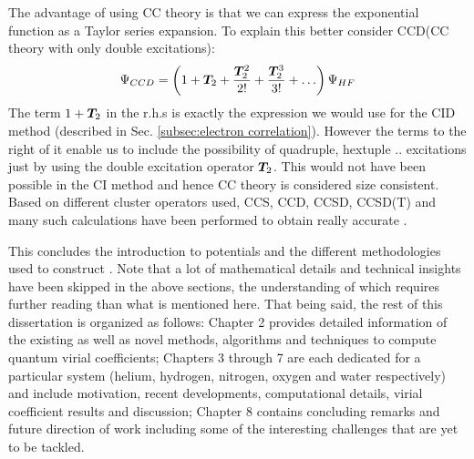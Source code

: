                 The advantage of using CC theory is that we can express the exponential function as a Taylor series expansion. To explain this better consider CCD(CC theory with only double excitations):
                \begin{equation}\label{eq:ccd}
                    \Psi_{CCD} = \left( 1 + {\boldsymbol {T}}_2 + \frac{{\boldsymbol {T}}_2^2}{2!} + \frac{{\boldsymbol {T}}_2^3}{3!} + \ldots \right) \Psi_{HF}
                \end{equation}
                The term $1 + {\boldsymbol {T}}_2$ in the r.h.s is exactly the expression we would use for the CID method (described in Sec. \ref{subsec:electron correlation}). However the terms to the right of it enable us to include the possibility of quadruple, hextuple .. excitations just by using the double excitation operator ${\boldsymbol {T}}_2$. This would not have been possible in the CI method and hence CC theory is considered size consistent. Based on different cluster operators used, CCS, CCD, CCSD, CCSD(T) and many such calculations have been performed to obtain really accurate \PESs.

                This concludes the introduction to \abinitio{} potentials and the different methodologies used to construct \PESs. Note that a lot of mathematical details and technical insights have been skipped in the above sections, the understanding of which requires further reading than what is mentioned here. That being said, the rest of this dissertation is organized as follows: Chapter 2 provides detailed information of the existing as well as novel methods, algorithms and techniques to compute quantum virial coefficients; Chapters 3 through 7 are each dedicated for a particular system (helium, hydrogen, nitrogen, oxygen and water respectively) and include motivation, recent developments, computational details, virial coefficient results and discussion; Chapter 8 contains concluding remarks and future direction of work including some of the interesting challenges that are yet to be tackled.
